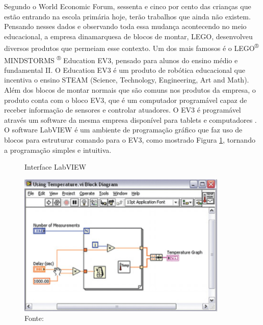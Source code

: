 Segundo o World Economic Forum, sessenta e cinco por cento das crianças que estão entrando na escola primária hoje, terão trabalhos que ainda não existem. Pensando  nesses dados e observando toda essa mudança acontecendo no meio educacional, a empresa dinamarquesa de blocos de montar, LEGO, desenvolveu diversos produtos que permeiam esse contexto. Um dos mais famosos é o LEGO\textsuperscript{®} MINDSTORMS \textsuperscript{®} Education EV3, pensado para alunos do ensino médio e fundamental II. O Education EV3 é um produto de robótica educacional que incentiva o ensino STEAM (Science, Technology, Engineering, Art and Math). Além dos blocos de montar normais que são comuns nos produtos da empresa, o produto conta com o bloco EV3, que é um computador programável capaz de receber informação de sensores e controlar atuadores. O EV3 é programável através um software da mesma empresa disponível para tablets e computadores \cite{lego_mindstorms}. O software LabVIEW é um ambiente de programação gráfico que faz uso de blocos para estruturar comando para o EV3, como mostrado Figura \ref{figura:labview}, tornando a programação simples e intuitiva. 

\begin{figure}[h!]
    \centering
    \caption{Interface LabVIEW}
    \includegraphics[width=10cm]{images/cap2/labview.png}
    \caption*{Fonte: \cite{labview}}
    \label{figura:labview}
\end{figure}

